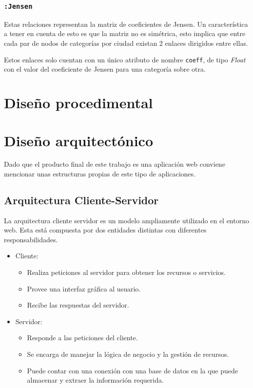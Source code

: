 \subsubsection{\texttt{:Jensen}}
Estas relaciones representan la matriz de coeficientes de Jensen. Un característica a tener en cuenta de esto es que la matriz no es simétrica, esto implica que entre cada par de nodos de categorías por ciudad existan 2 enlaces dirigidos entre ellas.

Estos enlaces solo cuentan con un único atributo de nombre \texttt{coeff}, de tipo \textit{Float} con el valor del coeficiente de Jensen para una categoría sobre otra.

\section{Diseño procedimental}

\section{Diseño arquitectónico}

Dado que el producto final de este trabajo es una aplicación web conviene mencionar unas estructuras propias de este tipo de aplicaciones.

\subsection{Arquitectura Cliente-Servidor}
La arquitectura cliente servidor es un modelo ampliamente utilizado en el entorno web. Esta está compuesta por dos entidades distintas con diferentes responsabilidades.

\begin{itemize}
	\item Cliente:
	\begin{itemize}
		\item Realiza peticiones al servidor para obtener los recursos o servicios.
		\item Provee una interfaz gráfica al usuario.
		\item Recibe las respuestas del servidor.
	\end{itemize}
	\item Servidor:
	\begin{itemize}
		\item Responde a las peticiones del cliente.
		\item Se encarga de manejar la lógica de negocio y la gestión de recursos.
		\item Puede contar con una conexión con una base de datos en la que puede almacenar y extraer la información requerida.
	\end{itemize}
\end{itemize}

